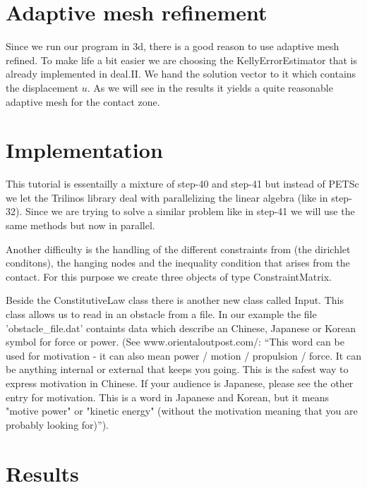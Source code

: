 \documentclass{article}
\begin{document}
\section{Adaptive mesh refinement}

Since we run our program in 3d, there is a good reason to use adaptive
mesh refined. To make life a bit easier we are choosing the
KellyErrorEstimator that is already implemented in deal.II. We hand the
solution vector to it which contains the displacement $u$. As we will see in the
results it yields a quite reasonable adaptive mesh for the contact zone.

\section{Implementation}

This tutorial is essentailly a mixture of step-40 and step-41 but instead of
PETSc we let the Trilinos library deal with parallelizing the linear algebra
(like in step-32). Since we are trying to solve a similar problem like in 
step-41 we will use the same methods but now in parallel.

Another difficulty is the handling of the different constraints from
(the dirichlet conditons), the hanging nodes and the inequality condition that 
arises from the contact. For this purpose we create three objects of type 
ConstraintMatrix.

Beside the ConstitutiveLaw class there is another new class called Input. This
class allows us to read in an obstacle from a file. In our example the file
'obstacle\_file.dat' containts data which describe an Chinese, Japanese or
Korean symbol for force or power. (See www.orientaloutpost.com/: ``This word can be used for motivation - it
can also mean power / motion / propulsion / force. It can be anything
internal or external that keeps you going. This is the safest way to express
motivation in Chinese. If your audience is Japanese, please see the other entry
for motivation. This is a word in Japanese and Korean, but it means "motive
power" or "kinetic energy" (without the motivation meaning that you are
probably looking for)'').

\section{Results}
\end{document}

